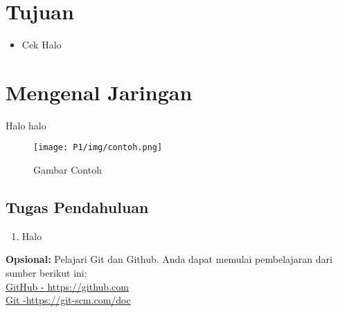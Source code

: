 \section{Tujuan}
\begin{itemize}[label=$\bullet$, itemsep=-1pt, leftmargin=*]
	\item Cek Halo
\end{itemize}

\section{Mengenal Jaringan}
Halo halo

\begin{figure}[H]
	\centering
	\texttt{[image: P1/img/contoh.png]}
	\caption{Gambar Contoh}
	\label{fig:gambarcontoh}
\end{figure}

\subsection{Tugas Pendahuluan}
\begin{enumerate}
	\item Halo
\end{enumerate}


\begin{center}
	\colorbox{cyan!30}{\parbox{0.8\linewidth}{\textbf{Opsional:} Pelajari Git dan Github. Anda dapat memulai pembelajaran dari sumber berikut ini: \\ \href{https://github.com}{GitHub - https://github.com} \\ \href{https://git-scm.com/doc}{Git -https://git-scm.com/doc}}}
\end{center}